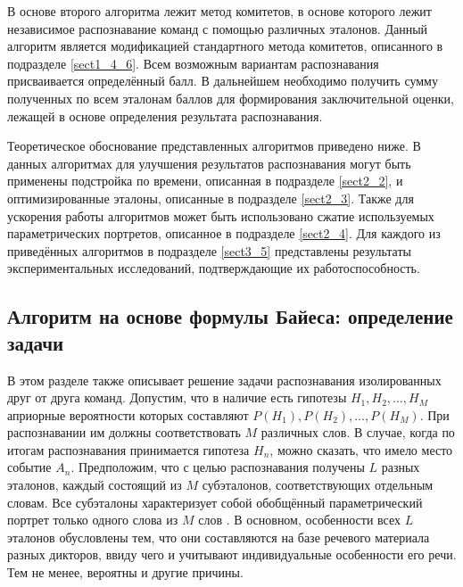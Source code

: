 В основе второго алгоритма лежит метод комитетов, в основе которого лежит независимое распознавание команд с помощью различных эталонов.
Данный алгоритм является модификацией стандартного метода комитетов, описанного в подразделе \ref{sect1_4_6}.
Всем возможным вариантам распознавания присваивается определённый балл.
В дальнейшем необходимо получить сумму полученных по всем эталонам баллов для формирования заключительной оценки, лежащей в основе определения результата распознавания.

Теоретическое обоснование представленных алгоритмов приведено ниже.
В данных алгоритмах для улучшения результатов распознавания могут быть применены подстройка по времени, описанная в подразделе \ref{sect2_2}, и оптимизированные эталоны, описанные в подразделе \ref{sect2_3}.
Также для ускорения работы алгоритмов может быть использовано сжатие используемых параметрических портретов, описанное в подразделе \ref{sect2_4}.
Для каждого из приведённых алгоритмов в подразделе \ref{sect3_5} представлены результаты экспериментальных исследований, подтверждающие их работоспособность.


\subsection{Алгоритм на основе формулы Байеса: определение задачи} \label{sect2_5_1}

В этом разделе также описывает решение задачи распознавания изолированных друг от друга команд.
Допустим, что в наличие есть гипотезы $H_1, H_2, \dots, H_M$ априорные вероятности которых составляют $P(H_1), P(H_2), \dots, P(H_M)$.
При распознавании им должны соответствовать $M$ различных слов.
В случае, когда по итогам распознавания принимается гипотеза $H_n$, можно сказать, что имело место событие $A_n$.
Предположим, что с целью распознавания получены $L$ разных эталонов, каждый состоящий из $M$ субэталонов, соответствующих отдельным словам.
Все субэталоны характеризует собой обобщённый параметрический портрет только одного слова из $M$ слов \cite{rabiner1993fundamentals, korsun2017recognition, korsun2016automatic}.
В основном, особенности всех $L$ эталонов обусловлены тем, что они составляются на базе речевого материала разных дикторов, ввиду чего и учитывают индивидуальные особенности его речи.
Тем не менее, вероятны и другие причины.

